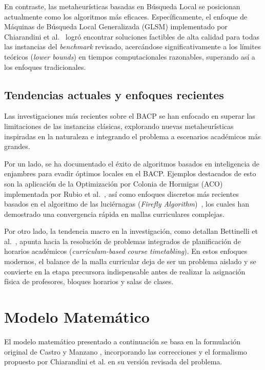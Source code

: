 \documentclass[letter, 10pt]{article}
\begin{document}
En contraste, las metaheur\'isticas basadas en B\'usqueda Local se posicionan actualmente como los algoritmos m\'as eficaces. Espec\'ificamente, el enfoque de M\'aquinas de B\'usqueda Local Generalizada (GLSM) implementado por Chiarandini et al.~\cite{Chiarandini2012} logr\'o encontrar soluciones factibles de alta calidad para todas las instancias del \textit{benchmark} revisado, acerc\'andose significativamente a los l\'imites te\'oricos (\textit{lower bounds}) en tiempos computacionales razonables, superando as\'i a los enfoques tradicionales.

\subsection{Tendencias actuales y enfoques recientes}
Las investigaciones m\'as recientes sobre el BACP se han enfocado en superar las limitaciones de las instancias cl\'asicas, explorando nuevas metaheur\'isticas inspiradas en la naturaleza e integrando el problema a escenarios acad\'emicos m\'as grandes. 

Por un lado, se ha documentado el \'exito de algoritmos basados en inteligencia de enjambres para evadir \'optimos locales en el BACP. Ejemplos destacados de esto son la aplicaci\'on de la Optimizaci\'on por Colonia de Hormigas (ACO) implementada por Rubio et al.~\cite{rubio2013}, as\'i como enfoques discretos m\'as recientes basados en el algoritmo de las luci\'ernagas (\textit{Firefly Algorithm})~\cite{Firefly2023}, los cuales han demostrado una convergencia r\'apida en mallas curriculares complejas.

Por otro lado, la tendencia macro en la investigaci\'on, como detallan Bettinelli et al.~\cite{Bettinelli2015}, apunta hacia la resoluci\'on de problemas integrados de planificaci\'on de horarios acad\'emicos (\textit{curriculum-based course timetabling}). En estos enfoques modernos, el balance de la malla curricular deja de ser un problema aislado y se convierte en la etapa precursora indispensable antes de realizar la asignaci\'on f\'isica de profesores, bloques horarios y salas de clases.
\section{Modelo Matem\'{a}tico}

El modelo matem\'{a}tico presentado a continuaci\'{o}n se basa en la formulaci\'{o}n original de Castro y Manzano \cite{Castro2001}, incorporando las correcciones y el formalismo propuesto por Chiarandini et al. \cite{Chiarandini2012} en su versi\'{o}n revisada del problema.
\end{document}
